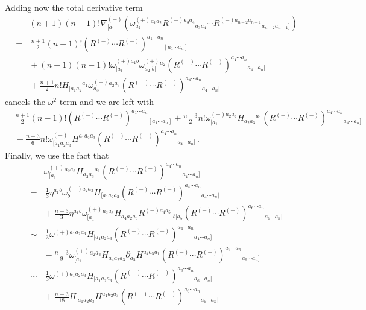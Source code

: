 \documentclass[a4paper,11pt]{article}
\begin{document}
Adding now the total derivative term 
\begin{equation}
\begin{aligned}
&(n+1)(n-1)!\nabla^{(+)}_{[a_1}\left(\omega^{(+)}_{a_2}{}^{a_1a_2}R^{(-)a_3a_4}{}_{a_3a_4}\cdots R^{(-)a_{n-2}a_{n-1}}{}_{a_{n-2}a_{n-1}]}\right)
\\
=&\,{}
\frac{n+1}{2}(n-1)!\left(R^{(-)}\cdots R^{(-)}\right)^{a_1\cdots a_n}{}_{[a_1\cdots a_n]}
\\
&{}
+(n+1)(n-1)!\omega_{[a_1}^{(+)a_1b}\omega^{(+)}_{a_2|b|}{}^{a_2}\left(R^{(-)}\cdots R^{(-)}\right)^{a_4\cdots a_n}{}_{a_4\cdots a_n]}
\\
&{}
+\frac{n+1}{2}n!H_{[a_1a_2}{}^{a_1}\omega^{(+)}_{a_3}{}^{a_2a_3}\left(R^{(-)}\cdots R^{(-)}\right)^{a_4\cdots a_n}{}_{a_4\cdots a_n]}
\end{aligned}
\end{equation}
cancels the $\omega^2$-term and we are left with
\begin{equation}
\begin{aligned}
&\frac{n+1}{2}(n-1)!\left(R^{(-)}\cdots R^{(-)}\right)^{a_1\cdots a_n}{}_{[a_1\cdots a_n]}
+\frac{n-3}{2}n!\omega_{[a_1}^{(+)a_2a_3}H_{a_2a_3}{}^{a_1}\left(R^{(-)}\cdots R^{(-)}\right)^{a_4\cdots a_n}{}_{a_4\cdots a_n]}
\\
&{}
-\frac{n-3}{6}n!\omega^{(-)}_{[a_1a_2a_3}H^{a_1a_2a_3}\left(R^{(-)}\cdots R^{(-)}\right)^{a_4\cdots a_n}{}_{a_4\cdots a_n]}\,.
\end{aligned}
\end{equation}
Finally, we use the fact that
\begin{equation}
\begin{aligned}
&\omega^{(+)}_{[a_1}{}^{a_2a_3}H_{a_2a_3}{}^{a_1}\left(R^{(-)}\cdots R^{(-)}\right)^{a_4\cdots a_n}{}_{a_4\cdots a_n]}
\\
=&\,{}
\frac13\eta^{a_1b}\omega_b^{(+)a_2a_3}H_{[a_1a_2a_3}\left(R^{(-)}\cdots R^{(-)}\right)^{a_4\cdots a_n}{}_{a_4\cdots a_n]}
\\
&{}
+\frac{n-3}{3}\eta^{a_1b}\omega^{(+)}_{[a_1}{}^{a_2a_3}H_{a_4a_2a_3}R^{(-)a_4a_5}{}_{|b|a_5}\left(R^{(-)}\cdots R^{(-)}\right)^{a_6\cdots a_n}{}_{a_6\cdots a_n]}
\\
\sim&\,{}
\frac13\omega^{(+)a_1a_2a_3}H_{[a_1a_2a_3}\left(R^{(-)}\cdots R^{(-)}\right)^{a_4\cdots a_n}{}_{a_4\cdots a_n]}
\\
&{}
-\frac{n-3}{9}\omega^{(+)}_{[a_1}{}^{a_2a_3}H_{a_4a_2a_3}\partial_{a_5}H^{a_4a_5a_1}\left(R^{(-)}\cdots R^{(-)}\right)^{a_6\cdots a_n}{}_{a_6\cdots a_n]}
\\
\sim&\,{}
\frac13\omega^{(+)a_1a_2a_3}H_{[a_1a_2a_3}\left(R^{(-)}\cdots R^{(-)}\right)^{a_6\cdots a_n}{}_{a_6\cdots a_n]}
\\
&{}
+\frac{n-3}{18}H_{[a_1a_2a_3}H^{a_1a_2a_3}\left(R^{(-)}\cdots R^{(-)}\right)^{a_6\cdots a_n}{}_{a_6\cdots a_n]}
\end{aligned}
\label{eq:omega-H-id}
\end{equation}
\end{document}
